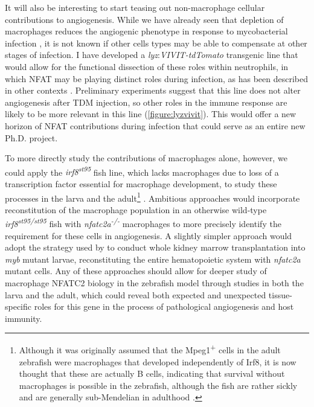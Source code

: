 It will also be interesting to start teasing out non\hyp{}macrophage cellular contributions to angiogenesis. While we have already seen that depletion of macrophages reduces the angiogenic phenotype in response to mycobacterial infection \citep{Oehlers2015}, it is not known if other cells types may be able to compensate at other stages of infection. I have developed a \textit{lyz}:\textit{VIVIT\hyp{}tdTomato} transgenic line that would allow for the functional dissection of these roles within neutrophils, in which NFAT may be playing distinct roles during infection, as has been described in other contexts \citep{Vega2007, Herbst2015, Vymazal2021}. Preliminary experiments suggest that this line does not alter angiogenesis after TDM injection, so other roles in the immune response are likely to be more relevant in this line (\autoref{figure:lyzvivit}). This would offer a new horizon of NFAT contributions during infection that could serve as an entire new Ph.D. project.

To more directly study the contributions of macrophages alone, however, we could apply the \textit{irf8\textsuperscript{st95}} fish line, which lacks macrophages due to loss of a transcription factor essential for macrophage development, to study these processes in the larva and the adult\footnote{Although it was originally assumed that the Mpeg1\textsuperscript{+} cells in the adult zebrafish were macrophages that developed independently of Irf8, it is now thought that these are actually B cells, indicating that survival without macrophages is possible in the zebrafish, although the fish are rather sickly and are generally sub\hyp{}Mendelian in adulthood \citep{Ferrero2020}.} \citep{Tamura2005, Xu2012, Shiau2015}. Ambitious approaches would incorporate reconstitution of the macrophage population in an otherwise wild\hyp{}type \textit{irf8\textsuperscript{st95/st95}} fish with \textit{nfatc2a\textsuperscript{\hyp{}/\hyp{}}} macrophages to more precisely identify the requirement for these cells in angiogenesis. A slightly simpler approach would adopt the strategy used by \citet{Cronan2021} to conduct whole kidney marrow transplantation into \textit{myb} mutant larvae, reconstituting the entire hematopoietic system with \textit{nfatc2a} mutant cells. Any of these approaches should allow for deeper study of macrophage NFATC2 biology in the zebrafish model through studies in both the larva and the adult, which could reveal both expected and unexpected tissue\hyp{}specific roles for this gene in the process of pathological angiogenesis and host immunity.

